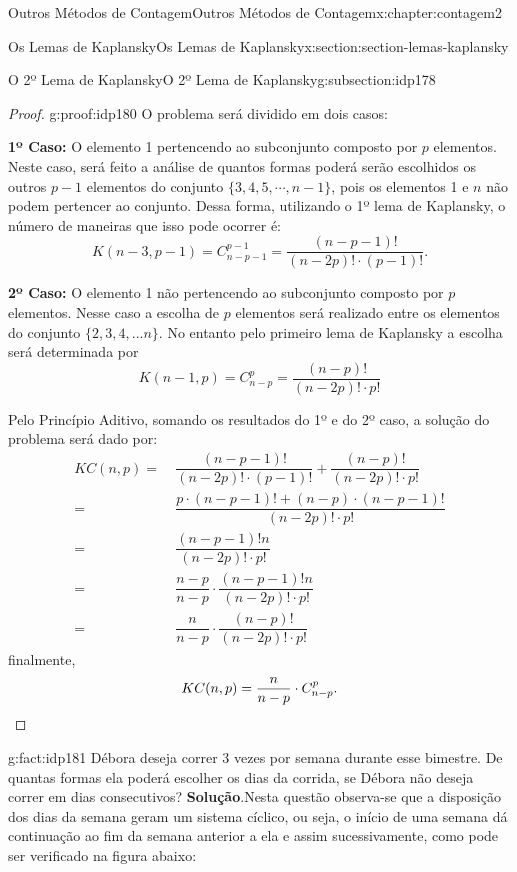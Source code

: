 \documentclass[oneside,10pt,]{book}
\newcommand{\blocktitlefont}{\relax}
\newcommand{\terminology}[1]{\textbf{#1}}
\newcommand{\qedhere}{\relax}
\numberwithin{equation}{section}
\newcommand{\amp}{&}
\begin{document}
\begin{chapterptx}{Outros Métodos de Contagem}{}{Outros Métodos de Contagem}{}{}{x:chapter:contagem2}
\begin{sectionptx}{Os Lemas de Kaplansky}{}{Os Lemas de Kaplansky}{}{}{x:section:section-lemas-kaplansky}
\begin{subsectionptx}{O 2º Lema de Kaplansky}{}{O 2º Lema de Kaplansky}{}{}{g:subsection:idp178}
\begin{proof}{}{g:proof:idp180}
O problema será dividido em dois casos:%
\par
\terminology{1º Caso:} O elemento 1 pertencendo ao subconjunto composto por \(p\) elementos. Neste caso, será feito a análise de quantos formas poderá serão escolhidos os outros \(p-1\) elementos do conjunto \(\{3,4,5,\cdots,n-1\}\), pois os elementos 1 e \(n\) não podem pertencer ao conjunto. Dessa forma, utilizando o 1º lema de Kaplansky, o número de maneiras que isso pode ocorrer é:%
\begin{equation*}
K(n-3,p-1)=C^{p-1}_{n-p-1}=\dfrac{(n-p-1)!}{(n-2p)!\cdot(p-1)!}.
\end{equation*}
%
\par
\terminology{2º Caso:} O elemento 1 não pertencendo ao subconjunto composto por \(p\) elementos. Nesse caso a escolha de \(p\) elementos será realizado entre os elementos do conjunto \(\{2,3,4,...n\}\). No entanto pelo primeiro lema de Kaplansky a escolha será determinada por%
\begin{equation*}
K(n-1,p)=C^p_{n-p}=\dfrac{(n-p)!}{(n-2p)!\cdot p!}
\end{equation*}
%
\par
Pelo Princípio Aditivo, somando os resultados do 1º e do 2º caso, a solução do problema será dado por:%
\begin{align*}
KC(n,p) = \amp ~\dfrac{(n-p-1)!}{(n-2p)!\cdot(p-1)!}+\dfrac{(n-p)!}{(n-2p)!\cdot p!} \\
=\amp ~ \dfrac{p\cdot (n-p-1)!+(n-p)\cdot(n-p-1)!}{{(n-2p)!\cdot p!}} \\
=\amp ~ \dfrac{(n-p-1)!n}{{(n-2p)!\cdot p!}} \\
=\amp ~ \dfrac{n-p}{n-p}\cdot\dfrac{(n-p-1)!n}{(n-2p)!\cdot p!} \\
=\amp ~ \dfrac{n}{n-p}\cdot\dfrac{(n-p)!}{(n-2p)!\cdot p!} 
\end{align*}
finalmente,%
\begin{equation*}
KC(n,p)=\dfrac{n}{n-p}\cdot C^p_{n-p}.\qedhere
\end{equation*}
%
\end{proof}
\begin{fact}{}{}{g:fact:idp181}%
Débora deseja correr 3 vezes por semana durante esse bimestre. De quantas formas ela poderá escolher os dias da corrida, se Débora não deseja correr em dias consecutivos?%
\textbf{\blocktitlefont Solução}.\quad{}Nesta  questão observa-se que a disposição dos dias da semana geram um sistema cíclico, ou seja, o início de uma semana dá continuação ao fim da semana anterior a ela e assim sucessivamente, como pode ser verificado na figura abaixo:%

\end{fact}
\end{subsectionptx}
\end{sectionptx}
\end{chapterptx}
\end{document}
